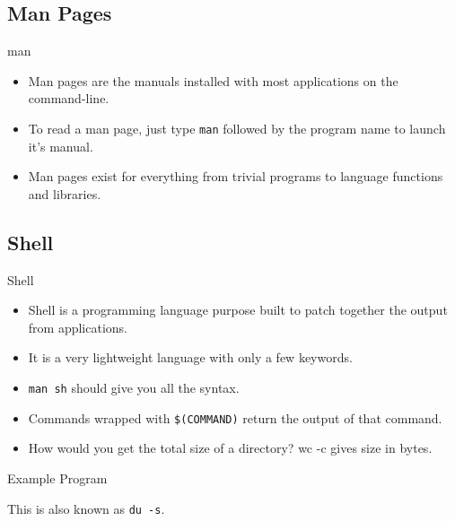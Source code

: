 \documentclass[10pt]{beamer}
\begin{document}
\subsection{Man Pages}
\begin{frame}{man}
\begin{itemize}
\item Man pages are the manuals installed with most applications on the command-line.
\item To read a man page, just type \texttt{\color{blue}man} followed by the program name to launch it's manual.
\item Man pages exist for everything from trivial programs to language functions and libraries.
\end{itemize}
\end{frame}

\subsection{Shell}
\begin{frame}{Shell}
\begin{itemize}
\item Shell is a programming language purpose built to patch together the output from applications.
\item It is a very lightweight language with only a few keywords.
\item \texttt{\color{blue}man sh} should give you all the syntax.
\item Commands wrapped with \texttt{\$(COMMAND)} return the output of that command.
\item How would you get the total size of a directory? \tiny{wc -c gives size in bytes}.
\end{itemize}
\end{frame}

\begin{frame}{Example Program}

This is also known as \texttt{\color{blue}du -s}.
\end{frame}
\end{document}
